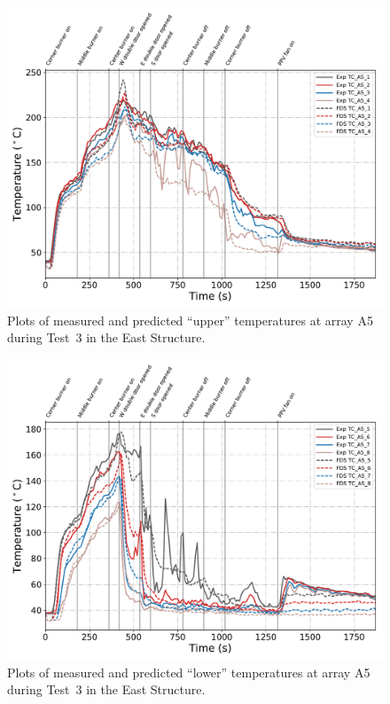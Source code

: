 \clearpage
\begin{figure}[p]
	\centering
	\includegraphics[width=\columnwidth]{Figures/Plots/Validation/Temperature/Test_3_TC_A5_upper}
	\caption{Plots of measured and predicted ``upper'' temperatures at array A5 during Test~3 in the East Structure.}
	\label{fig:TCA5_upper_data_Test3}
\end{figure}
\begin{figure}[p]
	\centering
	\includegraphics[width=\columnwidth]{Figures/Plots/Validation/Temperature/Test_3_TC_A5_lower}
	\caption{Plots of measured and predicted ``lower'' temperatures at array A5 during Test~3 in the East Structure.}
	\label{fig:TCA5_lower_data_Test3}
\end{figure}

